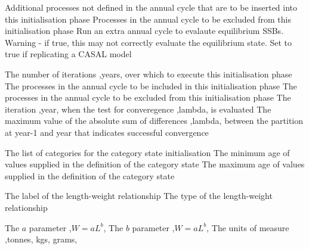 {Additional processes not defined in the annual cycle that are to be inserted into this initialisation phase}
 {Processes in the annual cycle to be excluded from this initialisation phase}
 {Run an extra annual cycle to evalaute equilibrium SSBs. Warning - if true, this may not correctly evaluate the equilibrium state. Set to true if replicating a CASAL model}
\par\textbf{}\par
{} {The number of iterations ,years, over which to execute this initialisation phase}
 {The processes in the annual cycle to be included in this initialisation phase}
 {The processes in the annual cycle to be excluded from this initialisation phase}
 {The iteration ,year, when the test for converegence ,lambda, is evaluated}
 {The maximum value of the absolute sum of differences ,lambda, between the partition at year-1 and year that indicates successful convergence}
\par\textbf{}\par
{} {The list of categories for the category state initialisation}
 {The minimum age of values supplied in the definition of the category state}
 {The maximum age of values supplied in the definition of the category state}
\par\par
{} {The label of the length-weight relationship}
 {The type of the length-weight relationship}
\par\textbf{}\par
{} {The $a$ parameter ,$W = a L^b$,}
 {The $b$ parameter ,$W = a L^b$,}
 {The units of measure ,tonnes, kgs, grams,}
\par\textbf{}\par
{}\par\par
\par\textbf{}\par
